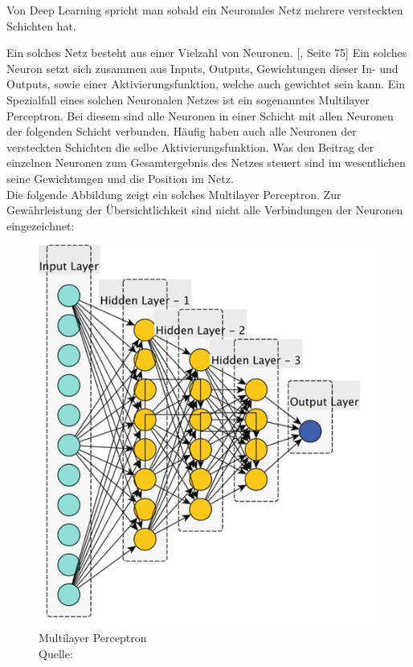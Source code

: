Von Deep Learning spricht man sobald ein Neuronales Netz mehrere versteckten Schichten hat. 

Ein solches Netz besteht aus einer Vielzahl von Neuronen. [\cite{sewak_deep_2019}, Seite 75] Ein solches Neuron setzt sich zusammen aus Inputs, Outputs, Gewichtungen dieser In- und Outputs, sowie einer Aktivierungsfunktion, welche auch gewichtet sein kann. Ein Spezialfall eines solchen Neuronalen Netzes ist ein sogenanntes Multilayer Perceptron. Bei diesem sind alle Neuronen in einer Schicht mit allen Neuronen der folgenden Schicht verbunden. Häufig haben auch alle Neuronen der versteckten Schichten die selbe Aktivierungsfunktion. Was den Beitrag der einzelnen Neuronen zum Gesamtergebnis des Netzes steuert sind im wesentlichen seine Gewichtungen und die Position im Netz.\\

Die folgende Abbildung zeigt ein solches Multilayer Perceptron. Zur Gewährleistung der Übersichtlichkeit sind nicht alle Verbindungen der Neuronen eingezeichnet:
\nopagebreak
\begin{figure}[H]
	\includegraphics[width=1\textwidth]{Bilder/mlp} 
	\caption[Multilayer Perceptron]{Multilayer Perceptron\\ Quelle: \cite{sewak_deep_2019}}
\end{figure}	


